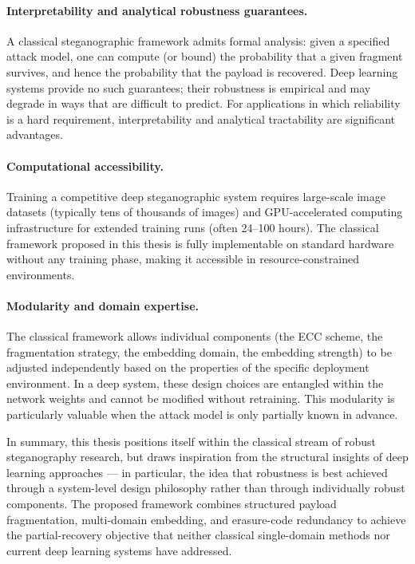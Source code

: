\documentclass[12pt,a4paper,oneside]{report}
\begin{document}
	\paragraph{Interpretability and analytical robustness guarantees.}
	A classical steganographic framework admits formal analysis: given a specified attack model, one
	can compute (or bound) the probability that a given fragment survives, and hence the probability
	that the payload is recovered. Deep learning systems provide no such guarantees; their robustness
	is empirical and may degrade in ways that are difficult to predict. For applications in which
	reliability is a hard requirement, interpretability and analytical tractability are significant
	advantages.
	
	\paragraph{Computational accessibility.}
	Training a competitive deep steganographic system requires large-scale image datasets (typically
	tens of thousands of images) and GPU-accelerated computing infrastructure for extended training
	runs (often 24--100 hours). The classical framework proposed in this thesis is fully implementable
	on standard hardware without any training phase, making it accessible in resource-constrained
	environments.
	
	\paragraph{Modularity and domain expertise.}
	The classical framework allows individual components (the ECC scheme, the fragmentation strategy,
	the embedding domain, the embedding strength) to be adjusted independently based on the properties
	of the specific deployment environment. In a deep system, these design choices are entangled within
	the network weights and cannot be modified without retraining. This modularity is particularly
	valuable when the attack model is only partially known in advance.
	
	In summary, this thesis positions itself within the classical stream of robust steganography
	research, but draws inspiration from the structural insights of deep learning approaches --- in
	particular, the idea that robustness is best achieved through a system-level design philosophy
	rather than through individually robust components. The proposed framework combines structured
	payload fragmentation, multi-domain embedding, and erasure-code redundancy to achieve the
	partial-recovery objective that neither classical single-domain methods nor current deep learning
	systems have addressed.
	
\end{document}
